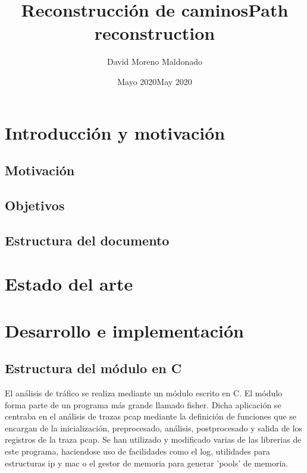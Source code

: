 \documentclass[twoside, 12pt]{epstfg}
\title[spa]{Reconstrucción de caminos}
\title[eng]{Path reconstruction}
\author{David Moreno Maldonado}
\date[spa]{Mayo 2020}
\date[eng]{May 2020}
\begin{document}

\frontmatter

\maketitle[spa]

\makeinnertitle[spa]


\tableofcontents
\clearpage
\listoftables
\clearpage
\listoffigures
\cleardoublepage

\printnoidxglossaries

\mainmatter

\chapter{Introducción y motivación}

\section{Motivación}

\section{Objetivos}

\section{Estructura del documento}


\chapter{Estado del arte}


\chapter{Desarrollo e implementación}
\label{chap:Desarrollo}

\section{Estructura del módulo en C}
El análisis de tráfico se realiza mediante un módulo escrito en C. El módulo forma parte de un programa más grande llamado fisher. Dicha aplicación se centraba en el análisis de trazas pcap mediante la definición de funciones que se encargan de la inicialización, preprocesado, análisis, postprocesado y salida de los registros de la traza pcap. Se han utilizado y modificado varias de las librerias de este programa, haciendose uso de facilidades como el log, utilidades para estructuras ip y mac o el gestor de memoria para generar 'pools' de memoria.
\end{document}
